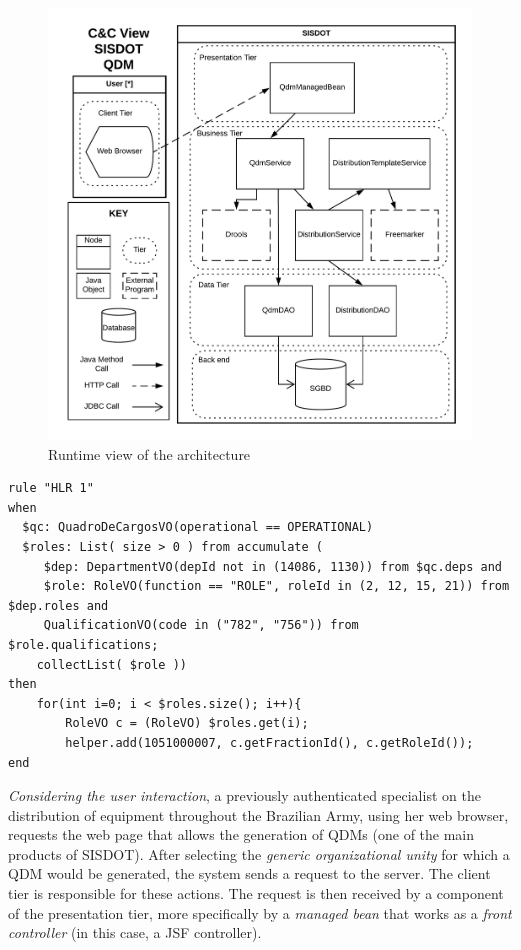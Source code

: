 \begin{figure}[!ht] \centering
\includegraphics[scale=0.55]{img/runtimeView_qdm.png}
\caption{Runtime view of the architecture} 
\label{fig:fig:runtime_qdm}
\end{figure}

\begin{lstlisting}[frame=single, float=*, language=DRL, caption=Example of a \emph{low-level Drools rule}, label={code:drl}]
rule "HLR 1"   	
when
  $qc: QuadroDeCargosVO(operational == OPERATIONAL)	
  $roles: List( size > 0 ) from accumulate ( 
     $dep: DepartmentVO(depId not in (14086, 1130)) from $qc.deps and
     $role: RoleVO(function == "ROLE", roleId in (2, 12, 15, 21)) from $dep.roles and  		
     QualificationVO(code in ("782", "756")) from $role.qualifications;				
    collectList( $role ))	 		
then		 
	for(int i=0; i < $roles.size(); i++){       	
		RoleVO c = (RoleVO) $roles.get(i);
		helper.add(1051000007, c.getFractionId(), c.getRoleId());   
end
\end{lstlisting}

\emph{Considering the user interaction}, a previously authenticated specialist on the 
distribution of equipment throughout the Brazilian Army, using her web browser, 
requests the web page that allows the generation of QDMs (one of the main products of SISDOT). 
After selecting the \emph{generic organizational unity} for which a QDM would be 
generated, the system sends a request to the server. The client tier is responsible for these actions. 
The request is then received by a component of the presentation tier, more specifically by a \emph{managed bean} that works 
as a \emph{front controller} (in this case, a JSF controller). 

